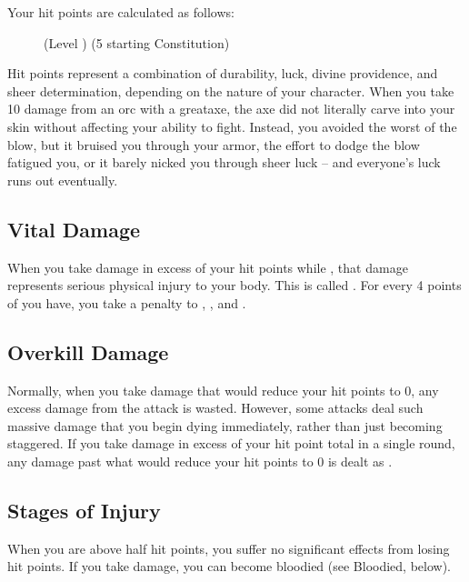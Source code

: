         Your hit points are calculated as follows:

        \begin{figure}[h]
            \centering (Level ) \x (5 \add starting Constitution)
        \end{figure}

         Hit points represent a combination of durability, luck, divine providence, and sheer determination, depending on the nature of your character.
        When you take 10 damage from an orc with a greataxe, the axe did not literally carve into your skin without affecting your ability to fight.
        Instead, you avoided the worst of the blow, but it bruised you through your armor, the effort to dodge the blow fatigued you, or it barely nicked you through sheer luck -- and everyone's luck runs out eventually.

    \subsection{Vital Damage}\label{Vital Damage}
        When you take damage in excess of your hit points while , that damage represents serious physical injury to your body.
        This is called .
        For every 4 points of  you have, you take a  penalty to , , and .

    \subsection{Overkill Damage}\label{Overkill Damage}
        Normally, when you take damage that would reduce your hit points to 0, any excess damage from the attack is wasted.
        However, some attacks deal such massive damage that you begin dying immediately, rather than just becoming staggered.
        If you take damage in excess of your  hit point total in a single round, any damage past what would reduce your hit points to 0 is dealt as .

    \subsection{Stages of Injury}

         When you are above half hit points, you suffer no significant effects from losing hit points.
        If you take damage, you can become bloodied (see Bloodied, below).


